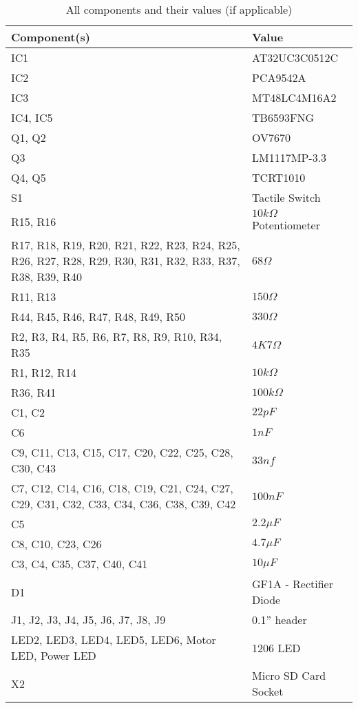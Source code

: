 \begin{table}
\caption{All components and their values (if applicable)}
\label{table:Components}
\begin{tabular}{p{7cm}p{5cm}}\toprule
\textbf{Component(s)}		&	\textbf{Value} \\ \toprule
IC1				&	AT32UC3C0512C \\ \midrule
IC2 & PCA9542A \\ \midrule
IC3 & MT48LC4M16A2 \\ \midrule
IC4, IC5 & TB6593FNG \\ \midrule
Q1, Q2 & OV7670 \\ \midrule
Q3	&	LM1117MP-3.3\\ \midrule
Q4, Q5	& TCRT1010 \\ \midrule
S1				&	Tactile Switch \\ \midrule
R15, R16 & $10k\Omega$ Potentiometer\\ \midrule
R17, R18, R19, R20, R21, R22, R23, R24, R25, R26, R27, R28, R29, R30, R31, R32, R33, R37, R38, R39, R40 & $68\Omega $ \\ \midrule
R11, R13 & $150\Omega$ \\ \midrule
R44, R45, R46, R47, R48, R49, R50	& $330\Omega$ \\ \midrule
R2, R3, R4, R5, R6, R7, R8, R9, R10,  R34, R35 & $4K7\Omega$ \\ \midrule
R1, R12, R14	& $10k\Omega$ \\ \midrule
R36, R41	& $100k\Omega$ \\ \midrule
C1, C2	&	$22pF$ \\ \midrule
C6 & $1nF$ \\ \midrule
C9, C11, C13, C15, C17, C20, C22, C25, C28, C30, C43 & $33nf$ \\ \midrule
C7, C12, C14, C16, C18, C19, C21, C24, C27, C29, C31, C32, C33, C34, C36, C38, C39, C42	&	$100nF$ \\ \midrule
C5	&	$2.2\mu F$ \\ \midrule
C8, C10, C23, C26  & $4.7\mu F $ \\ \midrule
C3, C4, C35, C37, C40, C41 &	$10\mu F$ \\ \midrule
D1 & GF1A - Rectifier Diode \\ \midrule
J1, J2, J3, J4, J5, J6, J7, J8, J9 & 0.1'' header \\ \midrule
LED2, LED3, LED4, LED5, LED6, Motor LED, Power LED	&	1206 LED \\  \midrule
X2 & Micro SD Card Socket \\ \bottomrule
\end{tabular}
\end{table}